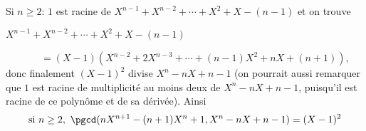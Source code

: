 {\begin{enumerate}
{Si $n\ge 2$: $1$ est racine de $X^{n-1}+X^{n-2}+\cdots+X^2+X-(n-1)$ et on trouve 

$X^{n-1}+X^{n-2}+\cdots+X^2+X-(n-1)$

\ \ \ \ \ \ \ $=(X-1)(X^{n-2}+2X^{n-3}+\cdots+(n-1)X^2+nX+(n+1))$, donc finalement 
$(X-1)^2$ divise $X^n-nX+n-1$ (on pourrait aussi remarquer 
que $1$ est racine de multiplicité au moins deux de 
$X^n-nX+n-1$, puisqu'il est racine de ce polynôme et de sa dérivée). 
Ainsi 
$$\text{si}\ n\ge 2,\ \pgcd(nX^{n+1}-(n+1)X^n+1,X^n-nX+n-1)=(X-1)^2$$}
\end{enumerate}
}

